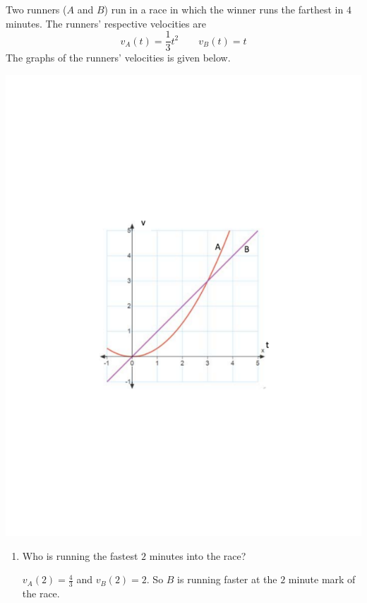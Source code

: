 \documentclass[noinstructornotes]{ximera}
\begin{document}
\newpage



\begin{problem}
Two runners ($A$ and $B$) run in a race in which the winner runs the farthest in $4$ minutes.  
The runners' respective velocities are
\[
v_A(t) = \frac{1}{3} t^2	\qquad	 v_B(t) = t
\]
The graphs of the runners' velocities is given below.  

\begin{image}
\includegraphics[trim= 270 250 250 250]{Figure6-2-1.pdf}
\end{image}

	\begin{enumerate}
		\item  Who is running the fastest $2$ minutes into the race?
		\begin{freeResponse}
		$v_A(2) = \frac{4}{3}$ and $v_B(2) = 2$.  
		So $B$ is running faster at the $2$ minute mark of the race.
		\end{freeResponse}
		

\end{enumerate}
\end{problem}
\end{document}
